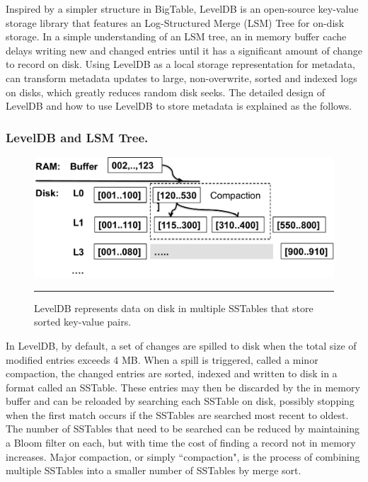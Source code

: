 Inspired by a simpler structure in BigTable\citep{BigTable}, 
LevelDB \citep{LevelDB} is an open-source key-value storage library
that features an Log-Structured Merge (LSM) Tree \citep{ONeil1996} for on-disk storage.
In a simple understanding of an LSM tree, an in memory buffer cache delays 
writing new and changed entries until it has a significant amount of change to record on disk.
Using LevelDB as a local storage representation for metadata, 
can transform metadata updates to large, non-overwrite, sorted and indexed logs on disks,
which greatly reduces random disk seeks.
The detailed design of LevelDB and how to use LevelDB to store metadata is explained as the follows.

\subsubsection*{LevelDB and LSM Tree. }

\begin{figure}[t]
\centering
\includegraphics[scale=0.4]{figs/leveldb}
\caption{LevelDB represents data on disk in multiple SSTables that store sorted key-value pairs.}
\vspace{10pt}
\hrule 
\label{fig:leveldb}
\end{figure}


In LevelDB, by default, a set of changes are spilled to disk when the total size of modified entries exceeds 4 MB.  When a spill is triggered, called a minor compaction, the changed entries are sorted, indexed and written to disk in a format called an SSTable\citep{BigTable}.  These entries may then be discarded by the in memory buffer and can be reloaded by searching each SSTable on disk, possibly stopping when the first match occurs if the SSTables are searched most recent to oldest.  The number of SSTables that need to be searched can be reduced by maintaining a Bloom filter\citep{bloomfilter} on each, but with time the cost of finding a record not in memory increases.  Major compaction, or simply ``compaction", is the process of combining multiple SSTables into a smaller number of SSTables by merge sort. 

